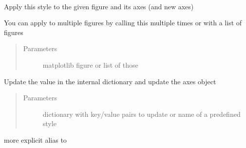 \documentclass[letterpaper,10pt,openany,oneside,english]{sphinxmanual}
\begin{document}
\begin{fulllineitems}
\begin{fulllineitems}
\begin{quote}
\begin{description}
\end{description}\end{quote}

\end{fulllineitems}


\begin{fulllineitems}
\label{\detokenize{config:config.Style.apply_to_fig}}~
\begin{DUlineblock}{0em}
\item[] Apply this style to the given figure and its axes (and new axes)  
\item[] You can apply to multiple figures by calling this multiple times or with a list of figures  
\end{DUlineblock}
\begin{quote}\begin{description}
\item[{Parameters}] \leavevmode
{} \textendash{} matplotlib figure or list of those

\end{description}\end{quote}

\end{fulllineitems}


\begin{fulllineitems}
\label{\detokenize{config:config.Style.update}}
Update the value in the internal dictionary and update the axes object
\begin{quote}\begin{description}
\item[{Parameters}] \leavevmode
{} \textendash{} dictionary with key/value pairs to update or name of a predefined style

\end{description}\end{quote}

\end{fulllineitems}


\begin{fulllineitems}
\label{\detokenize{config:config.Style.update_style}}
more explicit alias to 


\end{fulllineitems}
\end{fulllineitems}
\end{document}
